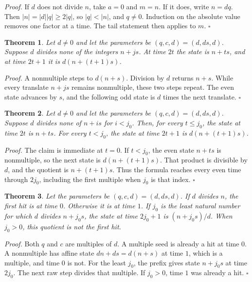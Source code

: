 \documentclass[11pt,letterpaper]{article}
\newtheorem{theorem}{Theorem}
\newenvironment{proof}{\noindent\textit{Proof.}}{\hfill\(\square\)}
\begin{document}
\begin{proof}
If \(d\) does not divide \(n\), take \(a=0\) and \(m=n\). If it does, write \(n=dq\). Then \(|n|=|d||q|\ge 2|q|\), so \(|q|<|n|\), and \(q\ne 0\). Induction on the absolute value removes one factor at a time. The tail statement then applies to \(m\).
\end{proof}

\begin{theorem}
\label{thm:equalrun}
Let \(d\ne 0\) and let the parameters be \((q,c,d)=(d,ds,d)\). Suppose \(d\) divides none of the integers \(n+js\). At time \(2t\) the state is \(n+ts\), and at time \(2t+1\) it is \(d(n+(t+1)s)\).
\end{theorem}

\begin{proof}
A nonmultiple steps to \(d(n+s)\). Division by \(d\) returns \(n+s\). While every translate \(n+js\) remains nonmultiple, these two steps repeat. The even state advances by \(s\), and the following odd state is \(d\) times the next translate.
\end{proof}

\begin{theorem}
\label{thm:equalprefix}
Let \(d\ne 0\) and let the parameters be \((q,c,d)=(d,ds,d)\). Suppose \(d\) divides none of \(n+is\) for \(i<j_{0}\). Then, for every \(t\le j_{0}\), the state at time \(2t\) is \(n+ts\). For every \(t<j_{0}\), the state at time \(2t+1\) is \(d(n+(t+1)s)\).
\end{theorem}

\begin{proof}
The claim is immediate at \(t=0\). If \(t<j_{0}\), the even state \(n+ts\) is nonmultiple, so the next state is \(d(n+(t+1)s)\). That product is divisible by \(d\), and the quotient is \(n+(t+1)s\). Thus the formula reaches every even time through \(2j_{0}\), including the first multiple when \(j_{0}\) is that index.
\end{proof}

\begin{theorem}
\label{thm:equalhit}
Let the parameters be \((q,c,d)=(d,ds,d)\). If \(d\) divides \(n\), the first hit is at time \(0\). Otherwise it is at time \(1\). If \(j_{0}\) is the least natural number for which \(d\) divides \(n+j_{0}s\), the state at time \(2j_{0}+1\) is \((n+j_{0}s)/d\). When \(j_{0}>0\), this quotient is not the first hit.
\end{theorem}

\begin{proof}
Both \(q\) and \(c\) are multiples of \(d\). A multiple seed is already a hit at time \(0\). A nonmultiple has affine state \(dn+ds=d(n+s)\) at time \(1\), which is a multiple, and time \(0\) is not. For the least \(j_{0}\), the prefix gives state \(n+j_{0}s\) at time \(2j_{0}\). The next raw step divides that multiple. If \(j_{0}>0\), time \(1\) was already a hit.
\end{proof}
\end{document}
